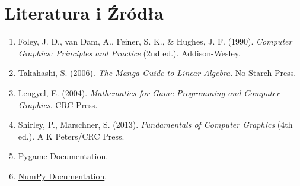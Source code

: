 \documentclass[a4paper,12pt]{article}
\begin{document}
\section{Literatura i Źródła}
\begin{enumerate}
    \item Foley, J. D., van Dam, A., Feiner, S. K., \& Hughes, J. F. (1990). \textit{Computer Graphics: Principles and Practice} (2nd ed.). Addison-Wesley.
    \item Takahashi, S. (2006). \textit{The Manga Guide to Linear Algebra}. No Starch Press.
    \item Lengyel, E. (2004). \textit{Mathematics for Game Programming and Computer Graphics}. CRC Press.
    \item Shirley, P., Marschner, S. (2013). \textit{Fundamentals of Computer Graphics} (4th ed.). A K Peters/CRC Press.
    \item \href{https://www.pygame.org/docs/}{Pygame Documentation}.
    \item \href{https://numpy.org/doc/}{NumPy Documentation}.
\end{enumerate}
\end{document}
